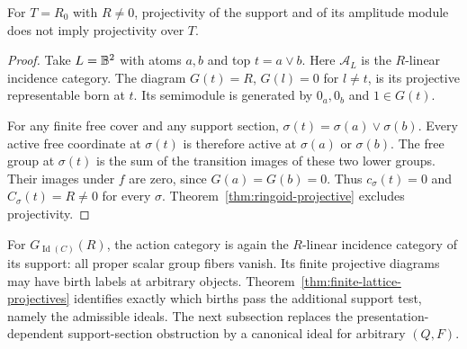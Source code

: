 \begin{proposition}\label{prop:ringoid-obstruction}
For $T=R_0$ with $R\ne0$, projectivity of the support and of its
amplitude module does not imply projectivity over $T$.
\end{proposition}
\begin{proof}
Take $L=\mathbb B^2$ with atoms $a,b$ and top $t=a\vee b$. Here
$\mathcal A_L$ is the $R$-linear incidence category. The diagram
$G(t)=R$, $G(l)=0$ for $l\ne t$, is its projective representable
born at $t$. Its semimodule is generated by $0_a,0_b$ and $1\in G(t)$.

For any finite free cover and any support section,
$\sigma(t)=\sigma(a)\vee\sigma(b)$. Every active free coordinate
at $\sigma(t)$ is therefore active at $\sigma(a)$ or $\sigma(b)$.
The free group at $\sigma(t)$ is the sum of the transition images
of these two lower groups. Their images under $f$ are zero, since
$G(a)=G(b)=0$. Thus $c_\sigma(t)=0$ and
$C_\sigma(t)=R\ne0$ for every $\sigma$. Theorem~\ref{thm:ringoid-projective}
excludes projectivity.
\end{proof}

For $G_{\operatorname{Id}(C)}(R)$, the action category is again the
$R$-linear incidence category of its support: all proper scalar group
fibers vanish. Its finite projective diagrams may have birth labels at
arbitrary objects. Theorem~\ref{thm:finite-lattice-projectives}
identifies exactly which births pass the additional support test,
namely the admissible ideals. The next subsection replaces the presentation-dependent support-section obstruction by a canonical ideal for arbitrary $(Q,F)$.
